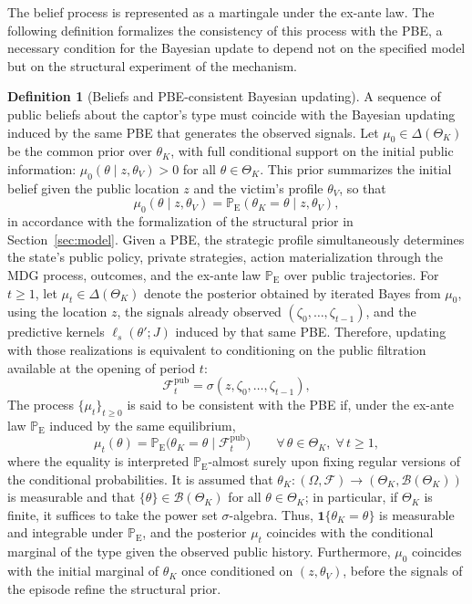 \documentclass[ecta,nameyear,draft]{econsocart}
\theoremstyle{plain}
\theoremstyle{definition}
\newtheorem{definition}[theorem]{Definition}
\newcommand{\ProbE}{\mathbb{P}_{\mathrm{E}}}
\newcommand{\ThetaK}{\Theta_K}
\newcommand{\1}{\mathbf{1}}
\begin{document}
The belief process is represented as a martingale under the ex-ante law. The following definition formalizes the consistency of this process with the PBE, a necessary condition for the Bayesian update to depend not on the specified model but on the structural experiment of the mechanism.

\begin{definition}[Beliefs and PBE-consistent Bayesian updating]\label{def:beliefs-martingale}
A sequence of public beliefs about the captor's type must coincide with the Bayesian updating induced by the same PBE that generates the observed signals. Let $\mu_0\in\Delta(\ThetaK)$ be the common prior over $\theta_K$, with full conditional support on the initial public information: $\mu_0(\theta \mid z,\theta_V)>0$ for all $\theta\in\ThetaK$. This prior summarizes the initial belief given the public location $z$ and the victim's profile $\theta_V$, so that
\[
\mu_0(\theta \mid z,\theta_V)=\ProbE(\theta_K=\theta\mid z,\theta_V),
\]
in accordance with the formalization of the structural prior in Section~\ref{sec:model}. Given a PBE, the strategic profile simultaneously determines the state's public policy, private strategies, action materialization through the MDG process, outcomes, and the ex-ante law $\ProbE$ over public trajectories. For $t\ge 1$, let $\mu_t\in\Delta(\ThetaK)$ denote the posterior obtained by iterated Bayes from $\mu_0$, using the location $z$, the signals already observed $(\zeta_0,\ldots,\zeta_{t-1})$, and the predictive kernels $\ell_s(\theta';J)$ induced by that same PBE. Therefore, updating with those realizations is equivalent to conditioning on the public filtration available at the opening of period $t$:
\[
\mathcal{F}_t^{\mathrm{pub}}=\sigma(z,\zeta_0,\ldots,\zeta_{t-1}),
\]
The process $\{\mu_t\}_{t\ge 0}$ is said to be consistent with the PBE if, under the ex-ante law $\ProbE$ induced by the same equilibrium,
\begin{equation}
\label{eq:beliefs-ebp-consistency}
\mu_t(\theta)=\ProbE\bigl(\theta_K=\theta\mid\mathcal{F}_t^{\mathrm{pub}}\bigr)\qquad \forall\,\theta\in\ThetaK,\;\forall\,t\ge 1,
\end{equation}
where the equality is interpreted $\ProbE$-almost surely upon fixing regular versions of the conditional probabilities. It is assumed that $\theta_K:(\Omega,\mathcal{F})\to(\ThetaK,\mathcal{B}(\ThetaK))$ is measurable and that $\{\theta\}\in\mathcal{B}(\ThetaK)$ for all $\theta\in\ThetaK$; in particular, if $\ThetaK$ is finite, it suffices to take the power set $\sigma$-algebra. Thus, $\mathbf{1}\{\theta_K=\theta\}$ is measurable and integrable under $\ProbE$, and the posterior $\mu_t$ coincides with the conditional marginal of the type given the observed public history. Furthermore, $\mu_0$ coincides with the initial marginal of $\theta_K$ once conditioned on $(z, \theta_V)$, before the signals of the episode refine the structural prior.
\end{definition}
\end{document}
